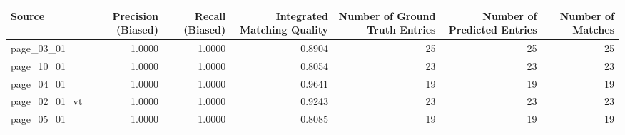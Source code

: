 \begin{tabular}{lrrrrrr}
\toprule
Source & Precision (Biased) & Recall (Biased) & Integrated Matching Quality & Number of Ground Truth Entries & Number of Predicted Entries & Number of Matches \\
\midrule
page\_03\_01 & 1.0000 & 1.0000 & 0.8904 & 25 & 25 & 25 \\
page\_10\_01 & 1.0000 & 1.0000 & 0.8054 & 23 & 23 & 23 \\
page\_04\_01 & 1.0000 & 1.0000 & 0.9641 & 19 & 19 & 19 \\
page\_02\_01\_vt & 1.0000 & 1.0000 & 0.9243 & 23 & 23 & 23 \\
page\_05\_01 & 1.0000 & 1.0000 & 0.8085 & 19 & 19 & 19 \\
\bottomrule
\end{tabular}
